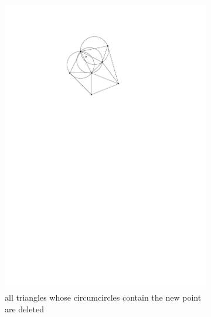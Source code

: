 \begin{figure}[h]
    \centering
    \begin{subfigure}[t]{0.5\textwidth}
        \centering
        \includegraphics{images/bow_wat_a.pdf}
        \caption{all triangles whose circumcircles contain the new point are deleted}
    \end{subfigure}%
    \begin{subfigure}[t]{0.5\textwidth}
        \centering

\end{subfigure}
\end{figure}
